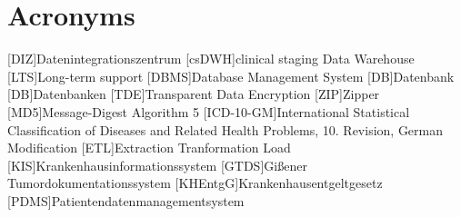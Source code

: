 \chapter*{Acronyms}
    \begin{acronym}[CDW]
    	[DIZ]{Datenintegrationszentrum}
    	[csDWH]{clinical staging Data Warehouse}
    	[LTS]{Long-term support}
    	[DBMS]{Database Management System}
    	[DB]{Datenbank}
    	[DB]{Datenbanken}
    	[TDE]{Transparent Data Encryption}
    	[ZIP]{Zipper}
    	[MD5]{Message-Digest Algorithm 5}
    	[ICD-10-GM]{International Statistical Classification of Diseases and Related Health Problems, 10. Revision, German Modification}
    	[ETL]{Extraction Tranformation Load}
    	[KIS]{Krankenhausinformationssystem}
    	[GTDS]{Gißener Tumordokumentationssystem}
    	[KHEntgG]{Krankenhausentgeltgesetz}
    	[PDMS]{Patientendatenmanagementsystem}
    \end{acronym}